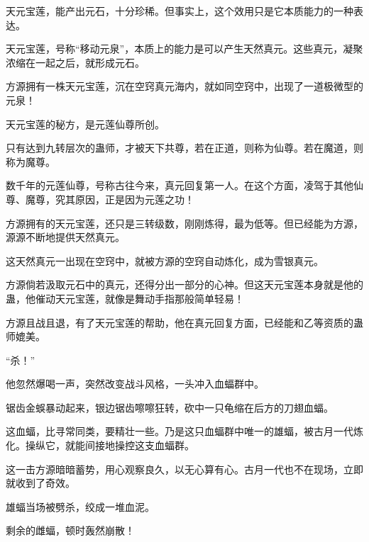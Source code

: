 \begin{this_body}
天元宝莲，能产出元石，十分珍稀。但事实上，这个效用只是它本质能力的一种表达。

天元宝莲，号称“移动元泉”，本质上的能力是可以产生天然真元。这些真元，凝聚浓缩在一起之后，就形成元石。

方源拥有一株天元宝莲，沉在空窍真元海内，就如同空窍中，出现了一道极微型的元泉！

天元宝莲的秘方，是元莲仙尊所创。

只有达到九转层次的蛊师，才被天下共尊，若在正道，则称为仙尊。若在魔道，则称为魔尊。

数千年的元莲仙尊，号称古往今来，真元回复第一人。在这个方面，凌驾于其他仙尊、魔尊，究其原因，正是因为元莲之功！

方源拥有的天元宝莲，还只是三转级数，刚刚炼得，最为低等。但已经能为方源，源源不断地提供天然真元。

这天然真元一出现在空窍中，就被方源的空窍自动炼化，成为雪银真元。

方源倘若汲取元石中的真元，还得分出一部分的心神。但这天元宝莲本身就是他的蛊，他催动天元宝莲，就像是舞动手指那般简单轻易！

方源且战且退，有了天元宝莲的帮助，他在真元回复方面，已经能和乙等资质的蛊师媲美。

“杀！”

他忽然爆喝一声，突然改变战斗风格，一头冲入血蝠群中。

锯齿金蜈暴动起来，银边锯齿嚓嚓狂转，砍中一只龟缩在后方的刀翅血蝠。

这血蝠，比寻常同类，要精壮一些。乃是这只血蝠群中唯一的雄蝠，被古月一代炼化。操纵它，就能间接地操控这支血蝠群。

这一击方源暗暗蓄势，用心观察良久，以无心算有心。古月一代也不在现场，立即就收到了奇效。

雄蝠当场被劈杀，绞成一堆血泥。

剩余的雌蝠，顿时轰然崩散！

\end{this_body}

